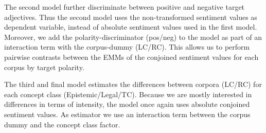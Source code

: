 \documentclass{article}
\begin{document}
The second model further discriminate between positive and negative target adjectives. Thus the second model uses the non-transformed sentiment values as dependent variable, instead of absolute sentiment values used in the first model. Moreover, we add the polarity-discriminator (pos/neg) to the model as part of an interaction term with the corpus-dummy (LC/RC). This allows us to perform pairwise contrasts between the EMMs of the conjoined sentiment values for each corpus by target polarity.


The third and final model estimates the differences between corpora (LC/RC) for each concept class (Epistemic/Legal/TC). Because we are mostly interested in differences in terms of intensity, the model once again uses absolute conjoined sentiment values. As estimator we use an interaction term between the corpus dummy and the concept class factor.

\end{document}
